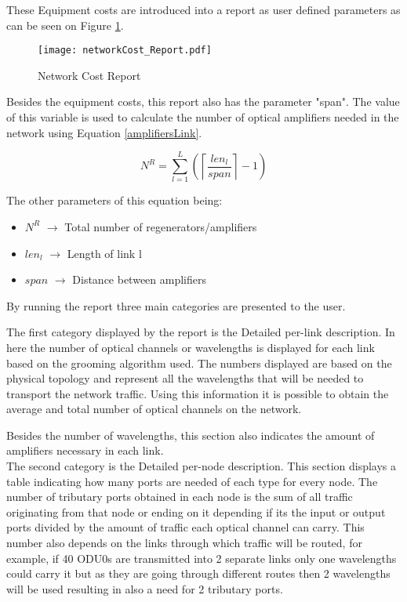 \documentclass[12pt, a4paper]{article}
\begin{document}
	These Equipment costs are introduced into a report as user defined parameters as can be seen on Figure \ref{networkCost_Report}.
	
	\begin{figure}[h!]
		\centering
		\texttt{[image: networkCost\_Report.pdf]}
		\caption{Network Cost Report}
		\label{networkCost_Report}
	\end{figure}	
	
	Besides the equipment costs, this report also has the parameter "span". The value of this variable is used to calculate the number of optical amplifiers needed in the network using Equation \ref{amplifiersLink}.
	
	\begin{equation}
		N^R = \sum\limits_{l=1}^L\left(\left\lceil\frac{len_l}{span}\right\rceil-1\right)
		\label{amplifiersLink}
	\end{equation}

	The other parameters of this equation being:
	
	\begin{itemize}
		\item{$N^R$			$\rightarrow$ Total number of regenerators/amplifiers}
		\item{$len_l$		$\rightarrow$ Length of link l}
		\item{$span$		$\rightarrow$ Distance between amplifiers}	
	\end{itemize}	
	
	By running the report three main categories are presented to the user.
	
	The first category displayed by the report is the Detailed per-link description. In here the number of optical channels or wavelengths is displayed for each link based on the grooming algorithm used. The numbers displayed are based on the physical topology and represent all the wavelengths that will be needed to transport the network traffic. Using this information it is possible to obtain the average and total number of optical channels on the network.
	
	Besides the number of wavelengths, this section also indicates the amount of amplifiers necessary in each link. \\
	
	The second category is the Detailed per-node description. This section displays a table indicating how many ports are needed of each type for every node. The number of tributary ports obtained in each node is the sum of all traffic originating from that node or ending on it depending if its the input or output ports divided by the amount of traffic each optical channel can carry. This number also depends on the links through which traffic will be routed, for example, if 40 ODU0s are transmitted into 2 separate links only one wavelengths could carry it but as they are going through different routes then 2 wavelengths will be used resulting in also a need for 2 tributary ports.\\
	
\end{document}
